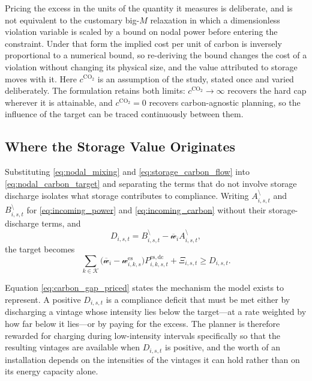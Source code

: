 \documentclass[journal]{IEEEtran}
\newcounter{assump}
\begin{document}
Pricing the excess in the units of the quantity it measures is deliberate,
and is not equivalent to the customary big-$M$ relaxation in which a
dimensionless violation variable is scaled by a bound on nodal power
before entering the constraint. Under that form the implied cost per unit
of carbon is inversely proportional to a numerical bound, so re-deriving
the bound changes the cost of a violation without changing its physical
size, and the value attributed to storage moves with it. Here
$c^{\mathrm{CO_2}}$ is an assumption of the study, stated once and
varied deliberately. The formulation retains both limits:
$c^{\mathrm{CO_2}}\!\to\!\infty$ recovers the hard cap wherever it is
attainable, and $c^{\mathrm{CO_2}}\!=\!0$ recovers carbon-agnostic
planning, so the influence of the target can be traced continuously
between them.

\subsection{Where the Storage Value Originates}
\label{sec:value_origin}

Substituting \eqref{eq:nodal_mixing} and \eqref{eq:storage_carbon_flow}
into \eqref{eq:nodal_carbon_target} and separating the terms that do not
involve storage discharge isolates what storage contributes to
compliance. Writing $A_{i,s,t}^{\setminus}$ and $B_{i,s,t}^{\setminus}$
for \eqref{eq:incoming_power} and \eqref{eq:incoming_carbon} without
their storage-discharge terms, and
\begin{equation}
D_{i,s,t}
=B_{i,s,t}^{\setminus}-\overline{\mathscr{w}}_iA_{i,s,t}^{\setminus},
\label{eq:carbon_deficit}
\end{equation}
the target becomes
\begin{equation}
\sum_{k\in\mathcal{K}}
\bigl(\overline{\mathscr{w}}_i-\mathscr{w}_{i,k,s}^{\mathrm{es}}\bigr)
P_{i,k,s,t}^{\mathrm{es,dc}}
+\Xi_{i,s,t}
\geq
D_{i,s,t}.
\label{eq:carbon_gap_priced}
\end{equation}

Equation \eqref{eq:carbon_gap_priced} states the mechanism the model
exists to represent. A positive $D_{i,s,t}$ is a compliance deficit that
must be met either by discharging a vintage whose intensity lies below
the target---at a rate weighted by how far below it lies---or by paying
for the excess. The planner is therefore rewarded for charging during
low-intensity intervals specifically so that the resulting vintages are
available when $D_{i,s,t}$ is positive, and the worth of an installation
depends on the intensities of the vintages it can hold rather than on its
energy capacity alone.
\end{document}
